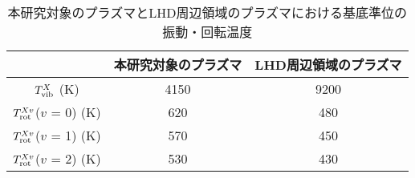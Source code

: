 \begin{table}
    \caption{本研究対象のプラズマとLHD周辺領域のプラズマ\cite{ishihara}における基底準位の振動・回転温度}
    \label{table:ground-result-compare}
    \centering
    \begin{tabular}{ccc}
        \hline
        & 本研究対象のプラズマ & LHD周辺領域のプラズマ\\
        \hline
        $T^X_{\rm vib}$ (K)& 4150 & 9200\\
        $T^{Xv}_{\rm rot}$($v$ = 0) (K)& 620 & 480\\
        $T^{Xv}_{\rm rot}$($v$ = 1) (K)& 570 & 450\\
        $T^{Xv}_{\rm rot}$($v$ = 2) (K)& 530 & 430\\
        \hline
    \end{tabular}
\end{table}
